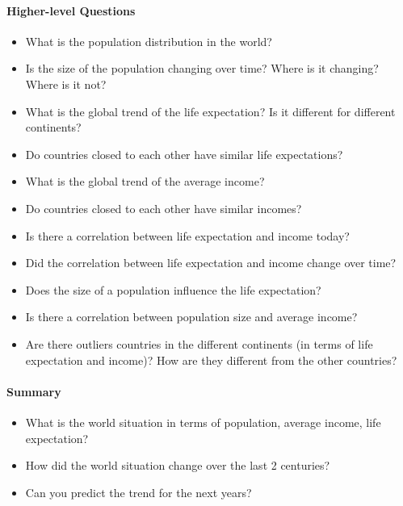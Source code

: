 \paragraph{Higher-level Questions}
\begin{itemize}

    \item What is the population distribution in the world?
    \item Is the size of the population changing over time? Where is it changing? Where is it not?

    \item What is the global trend of the life expectation? Is it different for different continents?
    \item Do countries closed to each other have similar life expectations?    

    \item What is the global trend of the average income?
    \item Do countries closed to each other have similar incomes?    

    \item Is there a correlation between life expectation and income today?    
    \item Did the correlation between life expectation and income change over time?

    \item Does the size of a population influence the life expectation?
    \item Is there a correlation between population size and average income?

    \item Are there outliers countries in the different continents (in terms of life expectation and income)? How are they different from the other countries?

\end{itemize}

\paragraph{Summary}
\begin{itemize}
    \item What is the world situation in terms of population, average income, life expectation?
    \item How did the world situation change over the last 2 centuries?
    \item Can you predict the trend for the next years?
\end{itemize}

